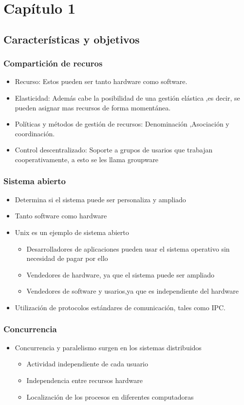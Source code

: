 \chapter{Capítulo 1}

\section{Características y objetivos}
\subsection{Compartición de recuros}
\begin{itemize}
    \item Recurso: Estos pueden ser tanto hardware como software. 
    \item Elasticidad: Además cabe la posibilidad de una gestión elástica 
    ,es decir, se pueden asignar mas recursos de forma momentánea.
    \item Políticas y métodos de gestión de recursos: Denominación ,Asociación y coordinación.
    \item Control descentralizado: Soporte a grupos de usarios que trabajan cooperativamente,
    a esto se les llama groupware
\end{itemize}
\subsection{Sistema abierto}
\begin{itemize}
    \item Determina si el sistema puede ser personaliza y ampliado
    \item Tanto software como hardware
    \item Unix es un ejemplo de sistema abierto
    \begin{itemize}
        \item Desarrolladores de aplicaciones pueden usar el sistema operativo sin necesidad de pagar por ello
        \item Vendedores de hardware, ya que el sistema puede ser ampliado
        \item Vendedores de software y usarios,ya que es independiente del hardware
    \end{itemize}
    \item Utilización de protocolos estándares de comunicación, tales como IPC.
\end{itemize}
\subsection{Concurrencia}
\begin{itemize}
    \item Concurrencia y paralelismo surgen en los sistemas distribuidos
    \begin{itemize}
        \item Actividad independiente de cada usuario
        \item Independencia entre recursos hardware
        \item Localización de los procesos en diferentes computadoras
    \end{itemize}
    \end{itemize}

